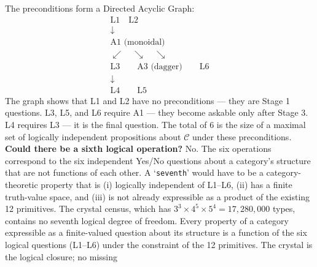 \documentclass[12pt,a4paper]{article}
\begin{document}
The preconditions form a Directed Acyclic Graph:
\[
\begin{array}{c}
\text{L1} \quad \text{L2} \\
\downarrow \\
\text{A1 (monoidal)} \\
\swarrow \quad \searrow \quad \searrow \\
\text{L3} \qquad \text{A3 (dagger)} \qquad \text{L6} \\
\downarrow \\
\text{L4} \qquad \text{L5}
\end{array}
\]
The graph shows that L1 and L2 have no preconditions --- they are Stage 1 questions. L3, L5, and L6 require A1 --- they
become askable only after Stage 3. L4 requires L3 --- it is the final question. The total of 6 is the size of a maximal
set of logically independent propositions about $\mathcal{C}$ under these preconditions.
\textbf{Could there be a sixth logical operation?} No. The six operations correspond to the six independent Yes/No
questions about a category's structure that are not functions of each other. A `\texttt{seventh}' would have to be a
category-theoretic property that is (i) logically independent of L1--L6, (ii) has a finite truth-value space, and (iii)
is not already expressible as a product of the existing 12 primitives. The crystal census, which has $3^3
\times 4^5 \times 5^4 = 17{,}280{,}000$ types, contains no seventh logical degree of freedom. Every property of a
category expressible as a finite-valued question about its structure is a function of the six logical questions
(L1--L6) under the constraint of the 12 primitives. The crystal is the logical closure; no missing
\end{document}
